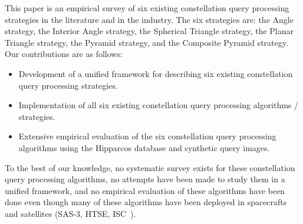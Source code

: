 This paper is an empirical survey of six existing constellation query processing strategies in the literature and in the industry.
The six strategies are: the Angle strategy, the Interior Angle strategy, the Spherical Triangle strategy, the Planar Triangle strategy, the Pyramid strategy, and the Composite Pyramid strategy.
Our contributions are as follows:
\begin{itemize}
    \item Development of a unified framework for describing six existing constellation query processing strategies.
    \item Implementation of all six existing constellation query processing algorithms / strategies.
    \item Extensive empirical evaluation of the six constellation query processing algorithms using the Hipparcos database and synthetic query images.
\end{itemize}
To the best of our knowledge, no systematic survey exists for these constellation query processing algorithms, no attempts have been made to study them in a unified framework, and no empirical evaluation of these algorithms have been done even though many of these algorithms have been deployed in spacecrafts and satellites (SAS-3, HTSE, ISC~\cite{gottlieb:spacecraftAttitudeDetermination,mortari:pyramidIdentification}).


